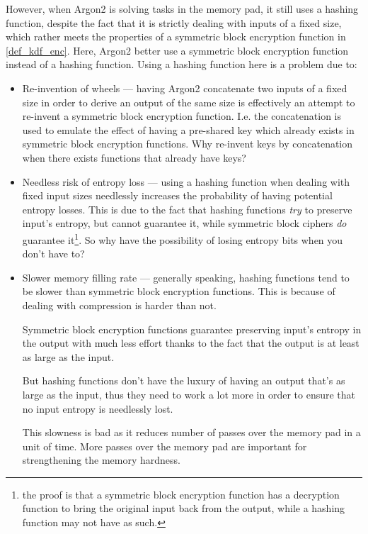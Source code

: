 \documentclass[twocolumn]{article}
\begin{document}
However, when Argon2 is solving tasks in the memory pad, it still
uses a hashing function, despite the fact that it is strictly dealing with
inputs of a fixed size, which rather meets the properties of a symmetric
block encryption function in \cref{def_kdf_enc}.  Here, Argon2
better use a symmetric block encryption function instead of a hashing
function.  Using a hashing function here is a problem due to:
\begin{itemize}
    \item Re-invention of wheels --- having Argon2 concatenate two
    inputs of a fixed size in order to derive an output of the same size is
    effectively an attempt to re-invent a symmetric block encryption
    function.  I.e. the concatenation is used to emulate the effect of
    having a pre-shared key which already exists in symmetric block
    encryption functions.  Why re-invent keys by concatenation when there
    exists functions that already have keys?

    \item Needless risk of entropy loss --- using a hashing function when
    dealing with fixed input sizes needlessly increases the probability of
    having potential entropy losses.  This is due to the fact that hashing
    functions \emph{try} to preserve input's entropy, but cannot guarantee
    it, while symmetric block ciphers \emph{do} guarantee it\footnote{the
    proof is that a symmetric block encryption function has a decryption
    function to bring the original input back from the output, while a
    hashing function may not have as such.}.  So why have the possibility
    of losing entropy bits when you don't have to?

    \item Slower memory filling rate --- generally speaking, hashing
    functions tend to be slower than symmetric block encryption functions.
    This is because of dealing with compression is harder than not.

    Symmetric block encryption functions guarantee preserving input's
    entropy in the output with much less effort thanks to the fact that the
    output is at least as large as the input.

    But hashing functions don't have the luxury of having an output that's
    as large as the input, thus they need to work a lot more in order to
    ensure that no input entropy is needlessly lost.

    This slowness is bad as it reduces number of passes over the memory pad
    in a unit of time.  More passes over the memory pad are important for
    strengthening the memory hardness.
\end{itemize}
\end{document}
